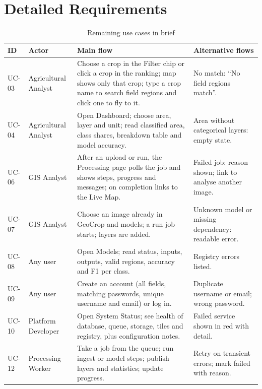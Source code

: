 \chapter{Detailed Requirements}\label{app:requirements}
\begin{table}[htbp]
\centering\small
\caption{Remaining use cases in brief}
\label{tab:ucbrief}
\begin{tabularx}{\textwidth}{L{1.1cm} L{2.6cm} Y L{2.6cm}}
\toprule
\textbf{ID} & \textbf{Actor} & \textbf{Main flow} & \textbf{Alternative flows}\\
\midrule
UC-03 & Agricultural Analyst & Choose a crop in the Filter chip or click a crop in the ranking; map shows only that crop; type a crop name to search field regions and click one to fly to it. & No match: ``No field regions match''.\\
UC-04 & Agricultural Analyst & Open Dashboard; choose area, layer and unit; read classified area, class shares, breakdown table and model accuracy. & Area without categorical layers: empty state.\\
UC-06 & GIS Analyst & After an upload or run, the Processing page polls the job and shows steps, progress and messages; on completion links to the Live Map. & Failed job: reason shown; link to analyse another image.\\
UC-07 & GIS Analyst & Choose an image already in GeoCrop and models; a run job starts; layers are added. & Unknown model or missing dependency: readable error.\\
UC-08 & Any user & Open Models; read status, inputs, outputs, valid regions, accuracy and F1 per class. & Registry errors listed.\\
UC-09 & Any user & Create an account (all fields, matching passwords, unique username and email) or log in. & Duplicate username or email; wrong password.\\
UC-10 & Platform Developer & Open System Status; see health of database, queue, storage, tiles and registry, plus configuration notes. & Failed service shown in red with detail.\\
UC-12 & Processing Worker & Take a job from the queue; run ingest or model steps; publish layers and statistics; update progress. & Retry on transient errors; mark failed with reason.\\
\bottomrule
\end{tabularx}
\end{table}

